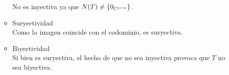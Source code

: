 \begin{mdframed}[style=s]
\begin{enumerate}
\begin{itemize}
                        No es inyectiva ya que $N(T)\neq\{0_{\mathbb{C}^{n\times n}}\}$.
                    \item Suryectividad\\
                        Como la imagen coincide con el codominio, es suryectiva.
                    \item Biyectividad\\
                        Si bien es suryectiva, el hecho de que no sea inyectiva provoca que $T$ no sea biyectiva.
                \end{itemize}
        \end{enumerate}
    \end{mdframed}